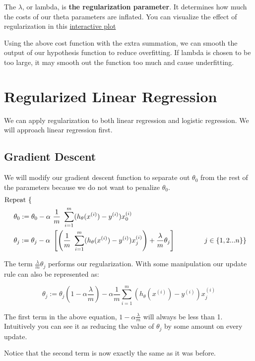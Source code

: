 The $\lambda$, or lambda, is \textbf{the regularization parameter}. It determines how much the costs of our theta parameters are inflated. You can visualize the effect of regularization in this \href{https://www.desmos.com/calculator/1hexc8ntqp}{interactive plot}

Using the above cost function with the extra summation, we can smooth the output of our hypothesis function to reduce overfitting. If lambda is chosen to be too large, it may smooth out the function too much and cause underfitting.

\section{Regularized Linear Regression}
We can apply regularization to both linear regression and logistic regression. We will approach linear regression first.

\subsection{Gradient Descent}
We will modify our gradient descent function to separate out $\theta_0$ from the rest of the parameters because we do not want to penalize $\theta_0$.
\begin{align*}
& \text{Repeat}\ \lbrace \\
& \ \ \ \ \theta_0 := \theta_0 - \alpha\ \frac{1}{m}\ \sum_{i=1}^m (h_\theta(x^{(i)}) - y^{(i)})x_0^{(i)} \\
& \ \ \ \ \theta_j := \theta_j - \alpha\ \left[ \left( \frac{1}{m}\ \sum_{i=1}^m (h_\theta(x^{(i)}) - y^{(i)})x_j^{(i)} \right) + \frac{\lambda}{m}\theta_j \right] &\ \ \ \ \ \ \ \ \ \ j \in \lbrace 1,2...n\rbrace\newline
& \rbrace
\end{align*}

The term $\frac{\lambda}{m}\theta_j$ performs our regularization.
With some manipulation our update rule can also be represented as:

\begin{equation}
\theta_j := \theta_j(1 - \alpha\frac{\lambda}{m}) - \alpha\frac{1}{m}\sum_{i=1}^m(h_\theta(x^{(i)}) - y^{(i)})x_j^{(i)}
\end{equation}

The first term in the above equation, $1 - \alpha\frac{\lambda}{m}$ will always be less than 1. Intuitively you can see it as reducing the value of $\theta_j$ by some amount on every update.

Notice that the second term is now exactly the same as it was before.

